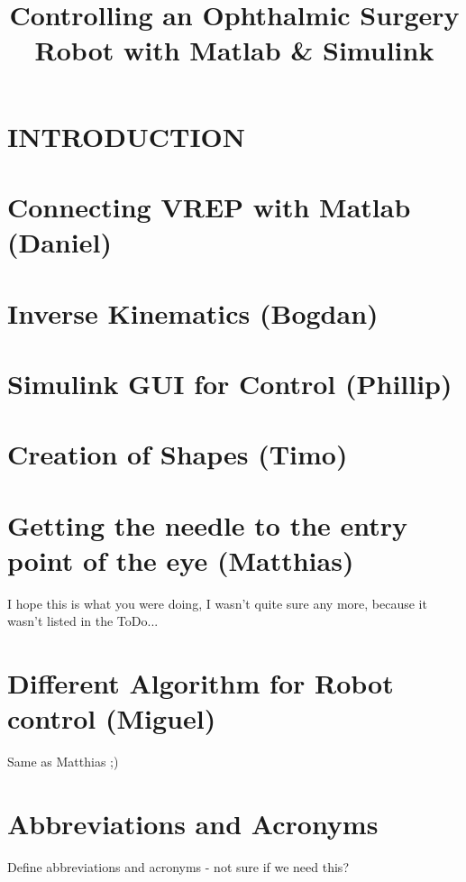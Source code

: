 \documentclass[a4paper, 10pt, conference]{ieeeconf}      %
\title{\LARGE \bf
Controlling an Ophthalmic Surgery Robot with Matlab \& Simulink
}
\begin{document}


\maketitle
\thispagestyle{empty}
\pagestyle{empty}

\begin{abstract}

\end{abstract}

\section{INTRODUCTION}


\section{Connecting VREP with Matlab (Daniel)}


\section{Inverse Kinematics (Bogdan)}


\section{Simulink GUI for Control (Phillip)}


\section{Creation of Shapes (Timo)}


\section{Getting the needle to the entry point of the eye (Matthias)}
I hope this is what you were doing, I wasn\rq t quite sure any more, because it wasn\rq t listed in the ToDo...\\

\section{Different Algorithm for Robot control (Miguel)}
Same as Matthias ;)\\


\section*{Abbreviations and Acronyms}
Define abbreviations and acronyms - not sure if we need this?
\end{document}
